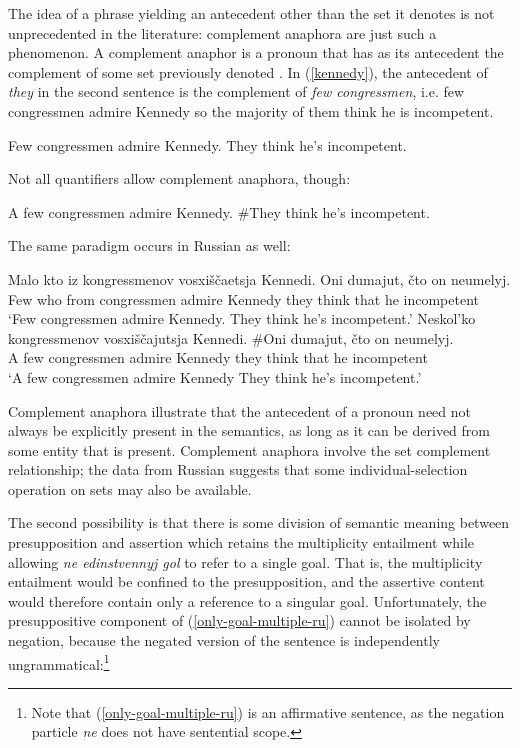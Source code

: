 \documentclass{article}
\begin{document}
The idea of a phrase yielding an antecedent other than the set it denotes is not unprecedented in the literature: complement anaphora are just such a phenomenon. A complement anaphor is a pronoun that has as its antecedent the complement of some set previously denoted \citep{nouwen03, schwarz09}. In (\ref{kennedy}), the antecedent of \textit{they} in the second sentence is the complement of \textit{few congressmen}, i.e. few congressmen admire Kennedy so the majority of them think he is incompetent.

\begin{exe}
	\ex \label{kennedy} Few congressmen admire Kennedy. They think he's incompetent.
\end{exe}

Not all quantifiers allow complement anaphora, though:

\begin{exe}
	\ex A few congressmen admire Kennedy. \#They think he's incompetent.
\end{exe}

The same paradigm occurs in Russian as well:

\begin{exe}
	\ex \gll Malo kto iz kongressmenov vosxi\v{s}\v{c}aetsja Kennedi. Oni dumajut, \v{c}to on neumelyj.\\
	Few who from congressmen admire Kennedy they think that he incompetent\\
	\glt `Few congressmen admire Kennedy. They think he's incompetent.'
	\ex \gll Neskol'ko kongressmenov vosxi\v{s}\v{c}ajutsja Kennedi. \#Oni dumajut, \v{c}to on neumelyj.\\
	{A few} congressmen admire Kennedy they think that he incompetent\\
	\glt `A few congressmen admire Kennedy They think he's incompetent.'
\end{exe}

Complement anaphora illustrate that the antecedent of a pronoun need not always be explicitly present in the semantics, as long as it can be derived from some entity that is present. Complement anaphora involve the set complement relationship; the data from Russian suggests that some individual-selection operation on sets may also be available.

The second possibility is that there is some division of semantic meaning between presupposition and assertion which retains the multiplicity entailment while allowing \textit{ne edinstvennyj gol} to refer to a single goal. That is, the multiplicity entailment would be confined to the presupposition, and the assertive content would therefore contain only a reference to a singular goal. Unfortunately, the presuppositive component of (\ref{only-goal-multiple-ru}) cannot be isolated by negation, because the negated version of the sentence is independently ungrammatical:\footnote{Note that (\ref{only-goal-multiple-ru}) is an affirmative sentence, as the negation particle \textit{ne} does not have sentential scope.}
\end{document}
